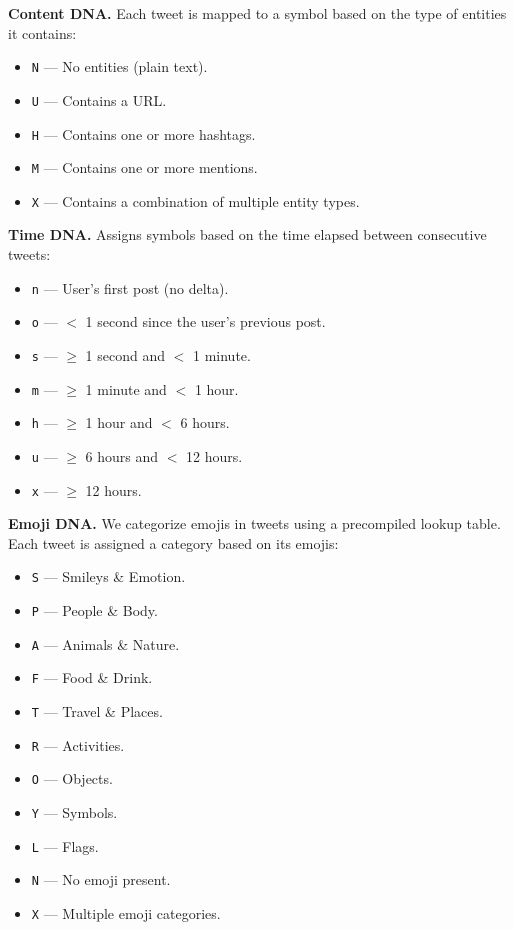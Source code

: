 \documentclass[conference]{IEEEtran}
\begin{document}
\textbf{Content DNA.} Each tweet is mapped to a symbol based on the type of entities it contains:
\begin{itemize}
    \item \texttt{N} --- No entities (plain text).
    \item \texttt{U} --- Contains a URL.
    \item \texttt{H} --- Contains one or more hashtags.
    \item \texttt{M} --- Contains one or more mentions.
    \item \texttt{X} --- Contains a combination of multiple entity types.
\end{itemize}

\textbf{Time DNA.}  
Assigns symbols based on the time elapsed between consecutive tweets:
\begin{itemize}
    \item \texttt{n} --- User's first post (no delta).
    \item \texttt{o} --- $<$ 1 second since the user's previous post.
    \item \texttt{s} --- $\geq$ 1 second and $<$ 1 minute.
    \item \texttt{m} --- $\geq$ 1 minute and $<$ 1 hour.
    \item \texttt{h} --- $\geq$ 1 hour and $<$ 6 hours.
    \item \texttt{u} --- $\geq$ 6 hours and $<$ 12 hours.
    \item \texttt{x} --- $\geq$ 12 hours.
\end{itemize}

\textbf{Emoji DNA.}  
We categorize emojis \citep{unicodeEmojiOrdering} in tweets using a precompiled lookup
table. Each tweet is assigned a category  based on its emojis:
\begin{itemize}
    \item \texttt{S} — Smileys \& Emotion.
    \item \texttt{P} — People \& Body.
    \item \texttt{A} — Animals \& Nature.
    \item \texttt{F} — Food \& Drink.
    \item \texttt{T} — Travel \& Places.
    \item \texttt{R} — Activities.
    \item \texttt{O} — Objects.
    \item \texttt{Y} — Symbols.
    \item \texttt{L} — Flags.
    \item \texttt{N} — No emoji present.
    \item \texttt{X} — Multiple emoji categories.
\end{itemize}
\end{document}

